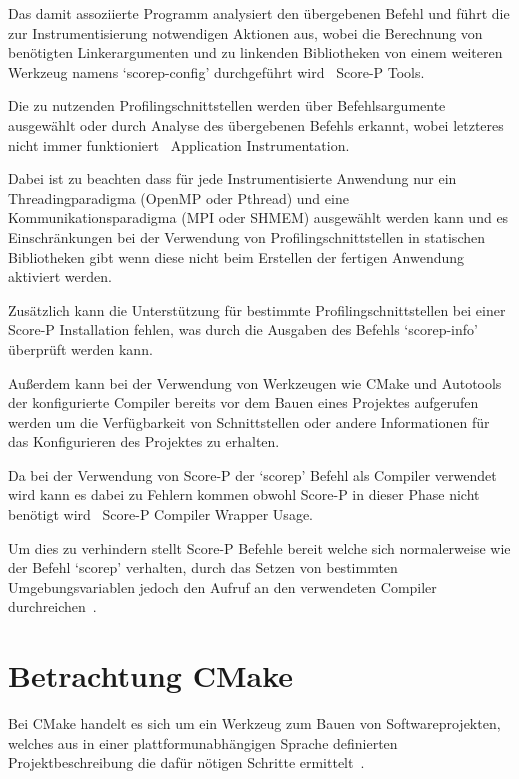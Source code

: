 \documentclass[german,proseminar,hyperref,utf8]{zihpub}
\begin{document}
    Das damit assoziierte Programm analysiert den übergebenen Befehl und führt die zur Instrumentisierung
    notwendigen Aktionen aus, wobei die Berechnung von benötigten Linkerargumenten und zu linkenden
    Bibliotheken von einem weiteren Werkzeug namens `scorep-config' durchgeführt wird~
    {Score-P Tools}.

    Die zu nutzenden Profilingschnittstellen werden über Befehlsargumente ausgewählt oder durch
    Analyse des übergebenen Befehls erkannt, wobei letzteres nicht immer funktioniert~
    {Application Instrumentation}.

    Dabei ist zu beachten dass für jede Instrumentisierte Anwendung nur ein Threadingparadigma
    (OpenMP oder Pthread) und eine Kommunikationsparadigma (MPI oder SHMEM) ausgewählt werden kann
    und es Einschränkungen bei der Verwendung von Profilingschnittstellen in statischen
    Bibliotheken gibt wenn diese nicht beim Erstellen der fertigen Anwendung aktiviert werden.

    Zusätzlich kann die Unterstützung für bestimmte Profilingschnittstellen bei einer Score-P
    Installation fehlen, was durch die Ausgaben des Befehls `scorep-info' überprüft werden kann.

    Au{\ss}erdem kann bei der Verwendung von Werkzeugen wie CMake und Autotools der konfigurierte Compiler
    bereits vor dem Bauen eines Projektes aufgerufen werden um die Verfügbarkeit von Schnittstellen
    oder andere Informationen für das Konfigurieren des Projektes zu erhalten.

    Da bei der Verwendung von Score-P der `scorep' Befehl als Compiler verwendet wird kann es dabei
    zu Fehlern kommen obwohl Score-P in dieser Phase nicht benötigt wird~
    {Score-P Compiler Wrapper Usage}.

    Um dies zu verhindern stellt Score-P Befehle bereit welche sich normalerweise wie der Befehl
    `scorep' verhalten, durch das Setzen von bestimmten Umgebungsvariablen jedoch den Aufruf an den
    verwendeten Compiler durchreichen~.

    \newpage
    \section{Betrachtung CMake}
    Bei CMake handelt es sich um ein Werkzeug zum Bauen von Softwareprojekten, welches aus in einer
    plattformunabhängigen Sprache definierten Projektbeschreibung die dafür nötigen Schritte
    ermittelt~.
\end{document}
